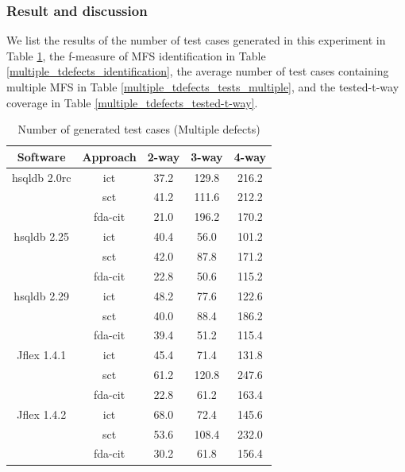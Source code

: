 \documentclass[journal,12pt,onecolumn,draftclsnofoot,]{IEEEtran}
\begin{document}
\subsubsection{Result and discussion}

We list the results of the number of test cases generated in this experiment in Table \ref{multiple_tdefects_tests}, the f-measure of MFS identification in Table \ref{multiple_tdefects_identification}, the average number of test cases containing multiple MFS in Table \ref{multiple_tdefects_tests_multiple}, and the tested-t-way coverage in Table \ref{multiple_tdefects_tested-t-way}.

\begin{table}[ht]
\caption{Number of generated test cases (Multiple defects)}
\label{multiple_tdefects_tests}
\centering
\begin{tabular}{|c|c|c|c|c|} \hline
Software&  Approach &  2-way & 3-way & 4-way\\ \hline
hsqldb 2.0rc	&ict	&37.2	&129.8	&216.2	\\
	&sct	&41.2	&111.6	&212.2	\\
	&fda-cit	&21.0	&196.2	&170.2	\\\hline
hsqldb 2.25	&ict	&40.4	&56.0	&101.2	\\
	&sct	&42.0	&87.8	&171.2	\\
	&fda-cit	&22.8	&50.6	&115.2	\\\hline
hsqldb 2.29	&ict	&48.2	&77.6	&122.6	\\
	&sct	&40.0	&88.4	&186.2	\\
	&fda-cit	&39.4	&51.2	&115.4	\\\hline
Jflex 1.4.1	&ict	&45.4	&71.4	&131.8	\\
	&sct	&61.2	&120.8	&247.6	\\
	&fda-cit	&22.8	&61.2	&163.4	\\\hline
Jflex 1.4.2	&ict	&68.0	&72.4	&145.6	\\
	&sct	&53.6	&108.4	&232.0	\\
	&fda-cit	&30.2	&61.8	&156.4	\\\hline
\end{tabular}
\end{table}
\end{document}
